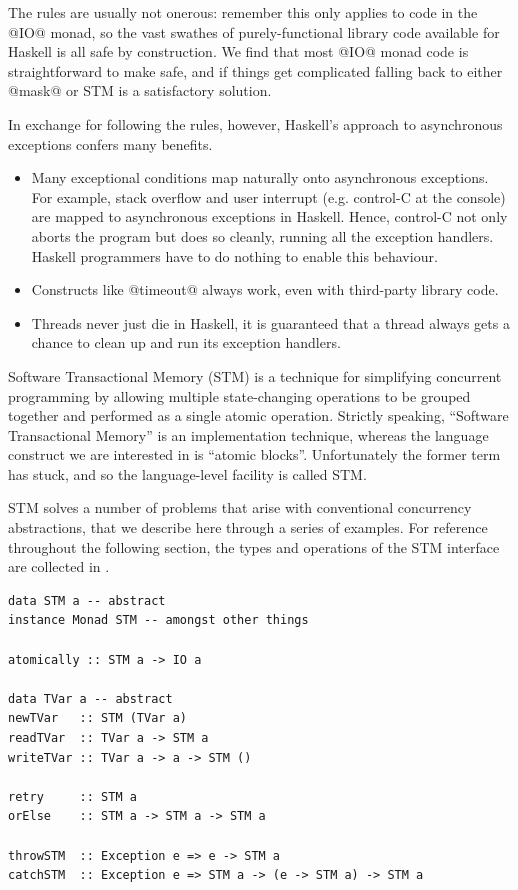 The rules are usually not onerous: remember this only applies to code
in the @IO@ monad, so the vast swathes of purely-functional library
code available for Haskell is all safe by construction.  We find that
most @IO@ monad code is straightforward to make safe, and if things
get complicated falling back to either @mask@ or STM is a satisfactory
solution.

In exchange for following the rules, however, Haskell's approach to
asynchronous exceptions confers many benefits.

\begin{itemize}
\item Many exceptional conditions map naturally onto asynchronous
  exceptions.  For example, stack overflow and user interrupt
  (e.g. control-C at the console) are mapped to asynchronous
  exceptions in Haskell.  Hence, control-C not only aborts the program
  but does so cleanly, running all the exception handlers.  Haskell
  programmers have to do nothing to enable this behaviour.

\item Constructs like @timeout@ always work, even with third-party
  library code.

\item Threads never just die in Haskell, it is guaranteed that a
  thread always gets a chance to clean up and run its exception
  handlers.
\end{itemize}


Software Transactional Memory (STM) is a technique for simplifying
concurrent programming by allowing multiple state-changing operations
to be grouped together and performed as a single atomic operation.
Strictly speaking, ``Software Transactional Memory'' is an
implementation technique, whereas the language construct we are
interested in is ``atomic blocks''.  Unfortunately the former term has
stuck, and so the language-level facility is called STM.

STM solves a number of problems that arise with conventional
concurrency abstractions, that we describe here through a series of
examples.  For reference throughout the following section, the types
and operations of the STM interface are collected in
.

\begin{lstlisting}[float,label=lst:stm,caption=the interface
    provided by \texttt{Control.Concurrent.STM},language=HaskellUlisses,style=numbers]
data STM a -- abstract
instance Monad STM -- amongst other things

atomically :: STM a -> IO a

data TVar a -- abstract
newTVar   :: STM (TVar a)
readTVar  :: TVar a -> STM a
writeTVar :: TVar a -> a -> STM ()

retry     :: STM a
orElse    :: STM a -> STM a -> STM a

throwSTM  :: Exception e => e -> STM a
catchSTM  :: Exception e => STM a -> (e -> STM a) -> STM a
\end{lstlisting}


